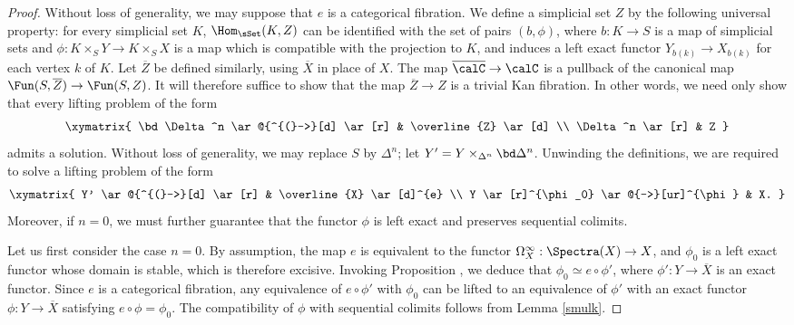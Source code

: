 \begin{proof}
Without loss of generality, we may suppose that $e$ is a categorical fibration.
We define a simplicial set $Z$ by the following universal property: for
every simplicial set $K$, $\Hom_{ \sSet}(K, Z)$ can be identified
with the set of pairs $(b, \phi)$, where $b: K \rightarrow S$ is a map
of simplicial sets and $\phi: K \times_{S} Y \rightarrow K \times_{S} X$
is a map which is compatible with the projection to $K$, and induces
a left exact functor $Y_{b(k)} \rightarrow X_{b(k)}$ for each vertex $k$ of $K$.
Let $\overline{Z}$ be defined similarly, using $\overline{X}$ in place of $X$.
The map $\overline{\calC} \rightarrow \calC$ is a pullback of the canonical map
$\Fun(S, \overline{Z}) \rightarrow \Fun(S, Z)$. It will therefore suffice to show that
the map $\overline{Z} \rightarrow Z$ is a trivial Kan fibration. In other words, we need only show that every lifting problem of the form
$$ \xymatrix{ \bd \Delta^n \ar@{^{(}->}[d] \ar[r] & \overline{Z} \ar[d] \\
\Delta^n \ar[r] & Z }$$
admits a solution. Without loss of generality, we may replace $S$ by $\Delta^n$;
let $Y' = Y \times_{ \Delta^n} \bd \Delta^n$. Unwinding the definitions, we are required
to solve a lifting problem of the form
$$ \xymatrix{ Y' \ar@{^{(}->}[d] \ar[r] & \overline{X} \ar[d]^{e} \\
Y \ar[r]^{\phi_0} \ar@{-->}[ur]^{\phi} & X. }$$
Moreover, if $n=0$, we must further guarantee that the functor $\phi$ is left
exact and preserves sequential colimits.

Let us first consider the case $n=0$. By assumption, the map $e$ is equivalent to
the functor $\Omega^{\infty}_{X}: \Spectra(X) \rightarrow X$, and $\phi_0$
is a left exact functor whose domain is stable, which is therefore excisive.
Invoking Proposition , we deduce that $\phi_0 \simeq e \circ \phi'$,
where $\phi': Y \rightarrow \overline{X}$ is an exact functor. Since $e$ is a categorical
fibration, any equivalence of $e \circ \phi'$ with $\phi_0$ can be lifted to an equivalence
of $\phi'$ with an exact functor $\phi: Y \rightarrow \overline{X}$ satisfying $e \circ \phi = \phi_0$.
The compatibility of $\phi$ with sequential colimits follows from Lemma \ref{smulk}.


\end{proof}
